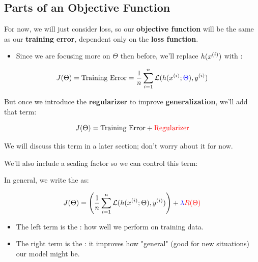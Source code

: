         
    \subsection{Parts of an Objective Function}
    
        For now, we will just consider loss, so our \textbf{objective function} will be the same as our \textbf{training error}, dependent only on the \textbf{loss function}.

        \begin{itemize}
            \item Since we are focusing more on $\Theta$ then before, we'll replace $h(x^{(i)})$ with :
        \end{itemize}
        
        
        
        \begin{equation*}
            J(\Theta) = \text{Training Error} = 
            \frac{1}{n}  \sum_{i=1}^n \mathcal{L} ( h(x^{(i)}; \textcolor{blue}{\Theta}), y^{(i)} ) 
        \end{equation*}
        
        
        
        But once we introduce the \textbf{regularizer}  to improve \textbf{generalization}, we'll add that term:
        
        \begin{equation*}
            J(\Theta) = \text{Training Error} + \textcolor{red}{\text{Regularizer}}
        \end{equation*}
        
        We will discuss this term in a later section; don't worry about it for now.
        
        We'll also include a scaling factor \blu{$\lambda$} so we can control this term:\\
        
        \begin{kequation}
            
            In general, we write the  as:
            
            \begin{equation*}
                J(\Theta) =
                \left( 
                \frac{1}{n}  \sum_{i=1}^n \mathcal{L} ( h(x^{(i)}; \Theta), y^{(i)} ) 
                \right)
                +
                \textcolor{blue}{\lambda} \textcolor{red}{ R(\Theta)}
            \end{equation*}

            \begin{itemize}
                \item The left term is the : how well we perform on training data.
                \item The right term is the : it improves how "general" (good for new situations) our model might be.
            \end{itemize}
        \end{kequation}
        
